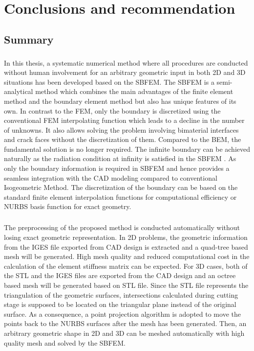 
\chapter{Conclusions and recommendation}
\section{Summary}
\paragraph{}
In this thesis, a systematic numerical method where all procedures are conducted without human involvement for an arbitrary geometric input in both 2D and 3D situations has been developed based on the SBFEM.
The SBFEM is a semi-analytical method which combines the main advantages of the finite element method and the boundary element method but also has unique features of its own.
In contrast to the FEM, only the boundary is discretized using the conventional FEM interpolating function which leads to a decline in the number of unknowns.
It also allows solving the problem involving bimaterial interfaces and crack faces without the discretization of them.
Compared to the BEM, the fundamental solution is no longer required.
The infinite boundary can be achieved naturally as the radiation condition at infinity is satisfied in the SBFEM .
As only the boundary information is required in SBFEM and hence provides a seamless integration with the CAD modeling compared to conventional Isogeometric Method.
The discretization of the boundary can be based on the standard finite element interpolation functions for computational efficiency or NURBS basis function for exact geometry.

\paragraph{}
The preprocessing of the proposed method is conducted automatically without losing exact geometric representation.
In 2D problems, the geometric information from the IGES file exported from CAD design is extracted and a quad-tree based mesh will be generated.
High mesh quality and reduced computational cost in the calculation of the element stiffness matrix can be expected. 
For 3D cases, both of the STL and the IGES files are exported from the CAD design and an octree based mesh will be generated based on STL file.
Since the STL file represents the triangulation of the geometric surfaces, intersections calculated during cutting stage is supposed to be located on the triangular plane instead of the original surface.
As a consequence, a point projection algorithm is adopted to move the points back to the NURBS surfaces after the mesh has been generated.
Then, an arbitrary geometric shape in 2D and 3D can be meshed automatically with high quality mesh and solved by the SBFEM.

